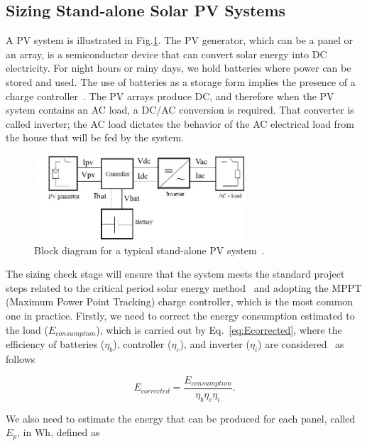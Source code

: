 \documentclass[runningheads]{llncs}
\begin{document}
\subsection{Sizing Stand-alone Solar PV Systems}
\label{sec:sizing}

A PV system is illustrated in Fig.\ref{fig:blockdiagram}. 
The PV generator, which can be a panel or an array, is a semiconductor device that can convert solar energy into DC electricity. 
For night hours or rainy days, we hold batteries where power can be stored and used. The use of batteries as a storage form implies the presence of a charge controller~\cite{Hansen}. The PV arrays produce DC, and therefore when the PV system contains an AC load, a DC/AC conversion is required. That converter is called inverter; the AC load dictates the behavior of the AC electrical load from the house that will be fed by the system.

\begin{figure}[h]
\includegraphics[width=0.7\textwidth]{blockdiagramPVS2_rev}
\centering
\caption{Block diagram for a typical stand-alone PV system~\cite{Hansen}.}
\label{fig:blockdiagram} 
\end{figure}

The sizing check stage will ensure that the system meets the standard project steps related to the critical period solar energy method~\cite{Pinho} and adopting the MPPT (Maximum Power Point Tracking) charge controller, which is the most common one in practice. 
%
Firstly, we need to correct the energy consumption estimated to the load ($E_{consumption}$), which is carried out by Eq.~\ref{eq:Ecorrected}, where the efficiency of batteries ($\eta_{b}$), controller ($\eta_{c}$), and inverter ($\eta_{i}$) are considered~\cite{Pinho} as follows

\begin{equation}
\label{eq:Ecorrected}
E_{corrected} = \frac {E_{consumption}}{\eta_{b} \eta_{c} \eta_{i} }.
\end{equation}

We also need to estimate the energy that can be produced for each panel, called $E_{p}$, in Wh, defined as
\end{document}
